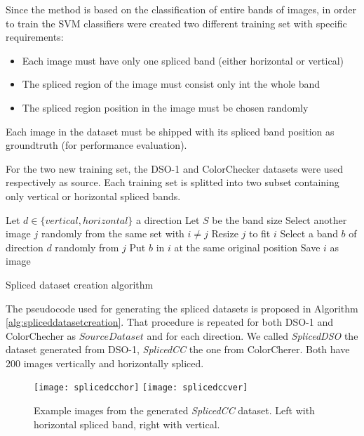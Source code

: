 Since the method is based on the classification of entire bands of images, in order to train the SVM classifiers were created two different training set with specific requirements:
\begin{itemize}
\item Each image must have only one spliced band (either horizontal or vertical)
\item The spliced region of the image must consist only int the whole band
\item The spliced region position in the image must be chosen randomly
\end{itemize}

Each image in the dataset must be shipped with its spliced band position as groundtruth (for performance evaluation).

For the two new training set, the DSO-1 and ColorChecker datasets were used respectively as source. Each training set is splitted into two subset containing only vertical or horizontal spliced bands.

\begin{algorithm}[!h]
\begin{algorithmic}[1]
\State Let $d \in \{vertical, horizontal\}$ a direction
\State Let $S$ be the band size
\State Select another image $j$ randomly from the same set with $i \neq j$
\State Resize $j$ to fit $i$
\State Select a band $b$ of direction $d$ randomly from $j$
\State Put $b$ in $i$ at the same original position
\State Save $i$ as image
\EndFor
\end{algorithmic}\caption{Spliced dataset creation algorithm}\label{alg:spliceddatasetcreation}
\end{algorithm}

The pseudocode used for generating the spliced datasets is proposed in Algorithm \ref{alg:spliceddatasetcreation}. That procedure is repeated for both DSO-1 and ColorChecher as $SourceDataset$ and for each direction. We called \emph{SplicedDSO} the dataset generated from DSO-1, \emph{SplicedCC} the one from ColorCherer. Both have 200 images vertically and horizontally spliced.

\begin{figure}[!htb]
  \texttt{[image: splicedcchor]}
\endminipage\hfill
{}
  \texttt{[image: splicedccver]}
\endminipage
\caption{Example images from the generated \emph{SplicedCC} dataset. Left with horizontal spliced band, right with vertical.}\label{fig:splicedccsamples}
\end{figure}

